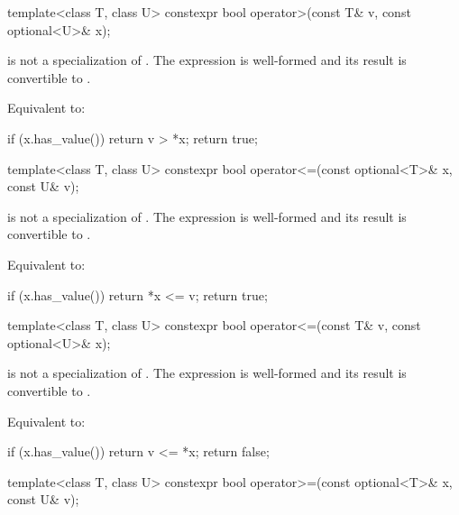 %
\begin{itemdecl}
template<class T, class U> constexpr bool operator>(const T& v, const optional<U>& x);
\end{itemdecl}

\begin{itemdescr}
\pnum
\constraints
{} is not a specialization of .
The expression  is well-formed and
its result is convertible to .

\pnum
\effects
Equivalent to:
\begin{codeblock}
if (x.has_value())
  return v > *x;
return true;
\end{codeblock}
\end{itemdescr}

%
\begin{itemdecl}
template<class T, class U> constexpr bool operator<=(const optional<T>& x, const U& v);
\end{itemdecl}

\begin{itemdescr}
\pnum
\constraints
{} is not a specialization of .
The expression  is well-formed and
its result is convertible to .

\pnum
\effects
Equivalent to:
\begin{codeblock}
if (x.has_value())
  return *x <= v;
return true;
\end{codeblock}
\end{itemdescr}

%
\begin{itemdecl}
template<class T, class U> constexpr bool operator<=(const T& v, const optional<U>& x);
\end{itemdecl}

\begin{itemdescr}
\pnum
\constraints
{} is not a specialization of .
The expression  is well-formed and
its result is convertible to .

\pnum
\effects
Equivalent to:
\begin{codeblock}
if (x.has_value())
  return v <= *x;
return false;
\end{codeblock}
\end{itemdescr}

%
\begin{itemdecl}
template<class T, class U> constexpr bool operator>=(const optional<T>& x, const U& v);
\end{itemdecl}

